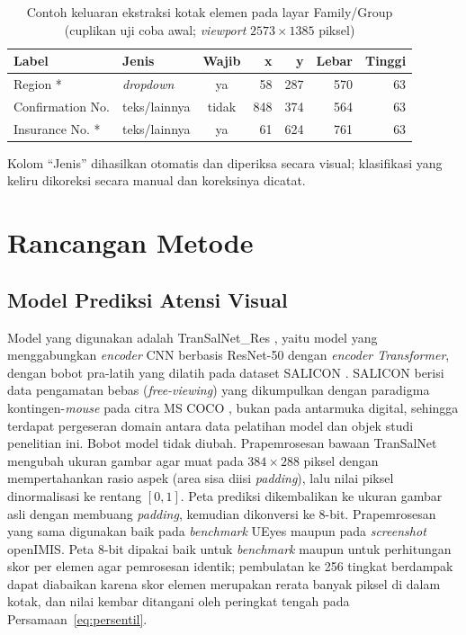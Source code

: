 \begin{table}[H]
  \centering
  \caption{Contoh keluaran ekstraksi kotak elemen pada layar Family/Group (cuplikan uji coba awal; \emph{viewport} $2573 \times 1385$ piksel)}
  \label{tab:contoh-dom}
  \begin{tabular}{llcrrrr}
    \hline
    \textbf{Label} & \textbf{Jenis} & \textbf{Wajib} & \textbf{x} & \textbf{y} & \textbf{Lebar} & \textbf{Tinggi} \\
    \hline
    Region * & \emph{dropdown} & ya & 58 & 287 & 570 & 63 \\
    Confirmation No. & teks/lainnya & tidak & 848 & 374 & 564 & 63 \\
    Insurance No. * & teks/lainnya & ya & 61 & 624 & 761 & 63 \\
    \hline
  \end{tabular}
\end{table}

Kolom ``Jenis'' dihasilkan otomatis dan diperiksa secara visual; klasifikasi yang keliru dikoreksi secara manual dan koreksinya dicatat.

\section{Rancangan Metode}
\label{sec:rancangan-metode}

\subsection{Model Prediksi Atensi Visual}
\label{subsec:model}

Model yang digunakan adalah TranSalNet\_Res \citep{lou2022transalnet}, yaitu model yang menggabungkan \emph{encoder} CNN berbasis ResNet-50 dengan \emph{encoder Transformer}, dengan bobot pra-latih yang dilatih pada dataset SALICON \citep{jiang2023ueyes}. SALICON berisi data pengamatan bebas (\emph{free-viewing}) yang dikumpulkan dengan paradigma kontingen-\emph{mouse} pada citra MS COCO \citep{jiang2023ueyes}, bukan pada antarmuka digital, sehingga terdapat pergeseran domain antara data pelatihan model dan objek studi penelitian ini. Bobot model tidak diubah. Prapemrosesan bawaan TranSalNet mengubah ukuran gambar agar muat pada $384 \times 288$ piksel dengan mempertahankan rasio aspek (area sisa diisi \emph{padding}), lalu nilai piksel dinormalisasi ke rentang $[0, 1]$. Peta prediksi dikembalikan ke ukuran gambar asli dengan membuang \emph{padding}, kemudian dikonversi ke 8-bit. Prapemrosesan yang sama digunakan baik pada \emph{benchmark} UEyes maupun pada \emph{screenshot} openIMIS. Peta 8-bit dipakai baik untuk \emph{benchmark} maupun untuk perhitungan skor per elemen agar pemrosesan identik; pembulatan ke 256 tingkat berdampak dapat diabaikan karena skor elemen merupakan rerata banyak piksel di dalam kotak, dan nilai kembar ditangani oleh peringkat tengah pada Persamaan~\eqref{eq:persentil}.

